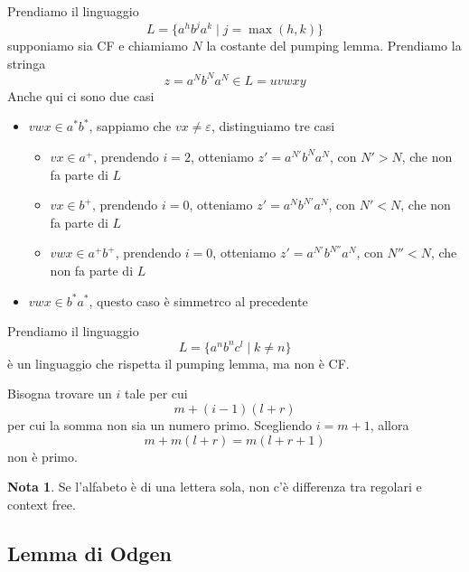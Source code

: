 \documentclass[12pt]{report}
\theoremstyle{definition}
\newtheorem{nota}{Nota}
\begin{document}
\begin{tcolorbox}[breakable]
	Prendiamo il linguaggio
	$$ L = \{ a^h b^j a^k \mid j = \max(h, k) \} $$
	supponiamo sia CF e chiamiamo $N$ la costante del pumping lemma.
	Prendiamo la stringa
	$$ z = a^N b^N a^N  \in L = u v w x y $$
	Anche qui ci sono due casi
	\begin{itemize}
		\item $vwx \in a^* b^*$, sappiamo che $vx \neq \varepsilon$, distinguiamo tre casi
			\begin{itemize}
				\item $vx \in a^+$, prendendo $i = 2$, otteniamo $z' = a^{N'} b^N a^N$, con $N' > N$, che non fa parte di $L$
				\item $vx \in b^+$, prendendo $i = 0$, otteniamo $z' = a^N b^{N'} a^N$, con $N' < N$, che non fa parte di $L$
				\item $vwx \in a^+b^+$, prendendo $i = 0$, otteniamo $z' = a^{N'} b^{N''} a^N$, con $N'' < N$, che non fa parte di $L$
			\end{itemize}
		\item $vwx \in b^* a^*$, questo caso è simmetrco al precedente
	\end{itemize}
\end{tcolorbox}

\begin{tcolorbox}
	Prendiamo il linguaggio
	$$ L = \{ a^n b^n c^l \mid k \neq n \} $$
	è un linguaggio che rispetta il pumping lemma, ma non è CF.
\end{tcolorbox}

Bisogna trovare un $i$ tale per cui 
$$ m + (i - 1)(l + r) $$
per cui la somma non sia un numero primo.
Scegliendo $i = m + 1$, allora 
$$ m + m(l + r) = m(l + r + 1) $$
non è primo.

\begin{nota}
Se l'alfabeto è di una lettera sola, non c'è differenza tra regolari e context free.
\end{nota}

\subsection{Lemma di Odgen}
\end{document}
